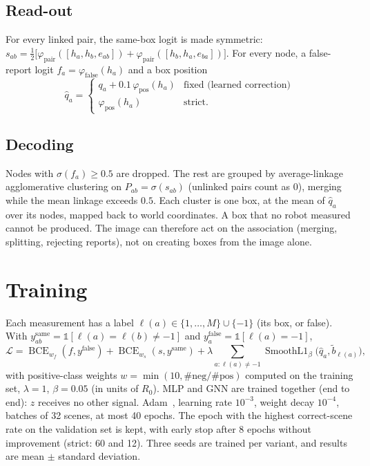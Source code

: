 \documentclass[conference]{IEEEtran}
\begin{document}
\subsection{Read-out}
For every linked pair, the same-box logit is made symmetric:
$s_{ab}=\tfrac12\bigl[\varphi_{\text{pair}}([h_a,h_b,e_{ab}])+\varphi_{\text{pair}}([h_b,h_a,e_{ba}])\bigr]$. For every node, a
false-report logit $f_a=\varphi_{\text{false}}(h_a)$ and a box position
\begin{equation}
\hat q_a=\begin{cases} q_a+0.1\,\varphi_{\text{pos}}(h_a) & \text{fixed (learned correction)}\\
\varphi_{\text{pos}}(h_a) & \text{strict.}\end{cases}
\end{equation}

\subsection{Decoding}
Nodes with $\sigma(f_a)\ge0.5$ are dropped. The rest are grouped by average-linkage agglomerative clustering on
$P_{ab}=\sigma(s_{ab})$ (unlinked pairs count as $0$), merging while the mean linkage exceeds $0.5$. Each cluster is
one box, at the mean of $\hat q_a$ over its nodes, mapped back to world coordinates. A box that no robot measured
cannot be produced. The image can therefore act on the association (merging, splitting, rejecting reports), not
on creating boxes from the image alone.

\section{Training}
\label{sec:training}

Each measurement has a label $\ell(a)\in\{1,\dots,M\}\cup\{-1\}$ (its box, or false). With $y^{\text{same}}_{ab}=\mathbb
1[\ell(a)=\ell(b)\ne-1]$ and $y^{\text{false}}_a=\mathbb 1[\ell(a)=-1]$,
\begin{equation}
\mathcal L=\operatorname{BCE}_{w_f}(f,y^{\text{false}})+\operatorname{BCE}_{w_s}(s,y^{\text{same}})
+\lambda\!\!\sum_{a:\ell(a)\ne-1}\!\!\operatorname{SmoothL1}_{\beta}\bigl(\hat q_a,\tilde b_{\ell(a)}\bigr),
\end{equation}
with positive-class weights $w=\min(10,\#\text{neg}/\#\text{pos})$ computed on the training set, $\lambda=1$,
$\beta=0.05$ (in units of $R_0$). MLP and GNN are trained together (end to end): $z$ receives no other signal.
Adam~\cite{kingma2015}, learning rate $10^{-3}$, weight decay $10^{-4}$, batches of 32 scenes, at most 40 epochs.
The epoch with the highest correct-scene rate on the validation set is kept, with early stop after 8 epochs
without improvement (strict: 60 and 12). Three seeds are trained per variant, and results are mean $\pm$ standard
deviation.
\end{document}
